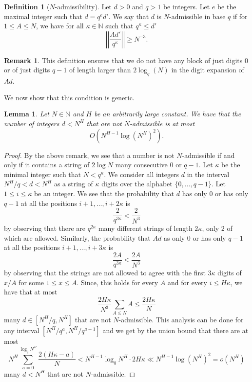 \documentclass[12pt]{amsart}
\renewcommand{\leq}{\leqslant}
\renewcommand{\geq}{\geqslant}
\newtheorem{lemma}[theorem]{Lemma}
\theoremstyle{definition}
\newtheorem{definition}[theorem]{Definition}
\newtheorem{remark}[theorem]{Remark}
\numberwithin{equation}{section}
\newcommand\NN{\mathbb{N}}
\numberwithin{equation}{section}
\begin{document}
\begin{definition}[$N$-admissibility]\label{def_admissibility}
	Let $d>0$ and $q>1$ be integers. Let $e$ be the maximal integer such that $d=q^ed'$. We say that $d$ is $N$-admissible in base $q$ if for $1\leq A \leq N$, we have for all $\kappa\in \NN$ such that $q^{\kappa}\leq d'$
	\[
	\left|\left|\frac{Ad'}{q^{\kappa}}\right|\right|\geq N^{-3}.
	\]
\end{definition}
\begin{remark}
	This definition ensures that we do not have any block of just digits $0$ or of just digits $\mathrel{{q}{-}{1}}$ of length larger than $2\log_q(N)$ in the digit expansion of $Ad$.
\end{remark}
We now show that this condition is generic.
\begin{lemma}
	 Let $N\in \NN$ and $H$ be an arbitrarily large constant. We have that the number of integers $d<N^H$ that are not $N$-admissible is at most 
	 \[
	 	O\left(N^{H-1}\log(N^H)^2\right).
	 \]
\end{lemma}
\begin{proof}
	By the above remark, we see that a number is not $N$-admissible if and only if it contains a string of $2\log N$ many consecutive $0$ or $q-1$. Let $\kappa$ be the minimal integer such that $N<q^{\kappa}$. We consider all integers $d$ in the interval $N^H/q<d<N^H$ as a string of $\kappa$ digits over the alphabet $\{0,\dots, q-1\}$. 
	Let $1\leq i \leq \kappa$ be an integer. We see that the probability that $d$ has only $0$ or has only $q-1$ at all the positions $i+1,\dots,i+2\kappa$ is
	\[
	\frac 2{q^{3 \kappa}} < \frac 2{N^{3}}
	\]
	by observing that there are $q^{2 \kappa}$ many different strings of length $2 \kappa$, only 2 of which are allowed. Similarly, the probability that $Ad$ as only $0$ or has only $q-1$ at all the positions $i+1,\dots,i+3\kappa$ is
	\[
		\frac {2A}{q^{3 \kappa}} < \frac {2A}{N^{3}}
	\]	
	by observing that the strings are not allowed to agree with the first $3\kappa$ digits of  $x/A$ for some $1\leq x\leq A$. Since, this holds for every $A$ and for every $i\leq H\kappa$, we have that at most
	\[
		\frac {2H\kappa}{N^{3}} \sum_{A\leq N}A \leq \frac{2H\kappa}{N}
	\]
	many $d\in [N^H/q,N^H]$ that are not $N$-admissible. This analysis can be done for any interval $[N^H/q^a,N^H/q^{a-1}]$ and we get by the union bound that there are at most
	\[
		N^H\sum_{a=0}^{\log_qN^H} \frac {2(H\kappa-a)}{N} < N^{H-1}\log_qN^H\cdot2H\kappa \ll N^{H-1}\log(N^H)^2 = o(N^H)
	\]
	many $d<N^H$ that are not $N$-admissible.
\end{proof}
\end{document}
